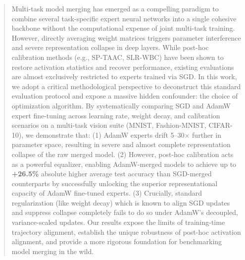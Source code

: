 \documentclass{article}
\theoremstyle{plain}
\theoremstyle{definition}
\theoremstyle{remark}
\begin{document}

\printAffiliationsAndNotice{} %

\begin{abstract}
Multi-task model merging has emerged as a compelling paradigm to combine several task-specific expert neural networks into a single cohesive backbone without the computational expense of joint multi-task training. However, directly averaging weight matrices triggers parameter interference and severe representation collapse in deep layers. While post-hoc calibration methods (e.g., SP-TAAC, SLR-WBC) have been shown to restore activation statistics and recover performance, existing evaluations are almost exclusively restricted to experts trained via SGD. In this work, we adopt a critical methodological perspective to deconstruct this standard evaluation protocol and expose a massive hidden confounder: the choice of optimization algorithm. By systematically comparing SGD and AdamW expert fine-tuning across learning rate, weight decay, and calibration scenarios on a multi-task vision suite (MNIST, Fashion-MNIST, CIFAR-10), we demonstrate that: (1) AdamW experts drift 5--30$\times$ further in parameter space, resulting in severe and almost complete representation collapse of the raw merged model. (2) However, post-hoc calibration acts as a powerful equalizer, enabling AdamW-merged models to achieve up to \textbf{+26.5\%} absolute higher average test accuracy than SGD-merged counterparts by successfully unlocking the superior representational capacity of AdamW fine-tuned experts. (3) Crucially, standard regularization (like weight decay) which is known to align SGD updates and suppress collapse completely fails to do so under AdamW's decoupled, variance-scaled updates. Our results expose the limits of training-time trajectory alignment, establish the unique robustness of post-hoc activation alignment, and provide a more rigorous foundation for benchmarking model merging in the wild.
\end{abstract}
\end{document}

